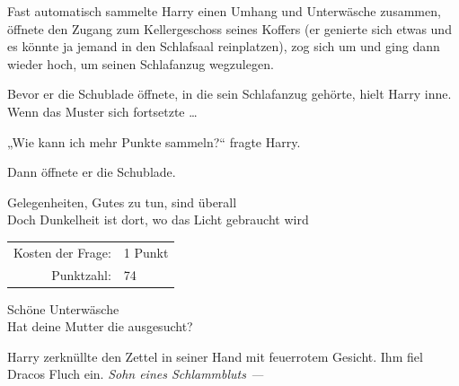 Fast automatisch sammelte Harry einen Umhang und Unterwäsche zusammen, öffnete den Zugang zum Kellergeschoss seines Koffers (er genierte sich etwas und es könnte ja jemand in den Schlafsaal reinplatzen), zog sich um und ging dann wieder hoch, um seinen Schlafanzug wegzulegen.

Bevor er die Schublade öffnete, in die sein Schlafanzug gehörte, hielt Harry inne. Wenn das Muster sich fortsetzte …

„Wie kann ich mehr Punkte sammeln?“ fragte Harry.



Dann öffnete er die Schublade.
\begin{writtenNote}
Gelegenheiten, Gutes zu tun, sind überall\\
Doch Dunkelheit ist dort, wo das Licht gebraucht wird

\begin{tabular}{rl}
Kosten der Frage: & 1 Punkt\\
Punktzahl: & 74
\end{tabular}

Schöne Unterwäsche\\
Hat deine Mutter die ausgesucht?
\end{writtenNote}

Harry zerknüllte den Zettel in seiner Hand mit feuerrotem Gesicht. Ihm fiel Dracos Fluch ein. \emph{Sohn eines Schlammbluts —}

